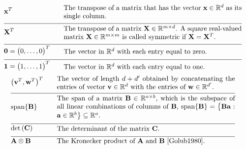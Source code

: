\begin{align}
	&\featurevec^{T} &\quad & \parbox{.75\textwidth}{The transpose of a matrix that has the vector 
		$\featurevec \in \mathbb{R}^{\dimlocalmodel}$ as its single column.} \nonumber \\[2mm] \hline \nonumber\\[-5mm]
	&\mathbf{X}^{T} &\quad & \parbox{.75\textwidth}{The transpose of a matrix $\mathbf{X} \in \mathbb{R}^{\samplesize \times \featurelen}$. 
		A square real-valued matrix $\mathbf{X} \in \mathbb{R}^{\samplesize \times \samplesize}$ 
		is called symmetric if $\mathbf{X} = \mathbf{X}^{T}$. }  \nonumber \\[2mm] \hline \nonumber\\[-5mm]
	&\mathbf{0}= \big(0,\ldots,0\big)^{T}  & \quad &  \parbox{.75\textwidth}{The vector in $\mathbb{R}^{\dimlocalmodel}$ with each entry equal to zero.} \nonumber \\[2mm] \hline \nonumber\\[-5mm]
	&\mathbf{1}= \big(1,\ldots,1\big)^{T}  & \quad &  \parbox{.75\textwidth}{The vector in $\mathbb{R}^{\dimlocalmodel}$ with each entry equal to one.} \nonumber
\end{align} 
\newpage
\begin{align} 
	&\big(\vv^{T},\vw^{T} \big)^{T}  & \quad &  \parbox{.75\textwidth}{The vector of length $\featurelen+\featurelen'$ 
		obtained by concatenating the entries of vector $\vv \in \mathbb{R}^{\featurelen}$ with the entries of $\vw \in \mathbb{R}^{\featurelen'}$.} \nonumber \nonumber \\[2mm] \hline \nonumber\\[-5mm]
	&	{\rm span}\{ \mathbf{B} \}  & \quad &  \parbox{.75\textwidth}{The span of a matrix $\mathbf{B} \in \mathbb{R}^{a \times b}$, 
		which is the subspace of all linear combinations of columns of $\mathbf{B}$, 
		${\rm span}\{ \mathbf{B} \} = \big\{  \mathbf{B} \va : \va \in \mathbb{R}^{b} \big\} \subseteq \mathbb{R}^{a}$.}\nonumber \\[2mm] \hline \nonumber\\[-5mm]
	&\determinant{\mC} &\quad & \parbox{.75\textwidth}{The determinant of the matrix $\mC$. } \nonumber \\[2mm] \hline \nonumber\\[-5mm]
	&\mathbf{A} \otimes \mathbf{B} &\quad & \parbox{.75\textwidth}{The Kronecker product of $\mathbf{A}$ and $\mathbf{B}$ \cite{Golub1980}. }  \nonumber
\end{align} 

\newpage

